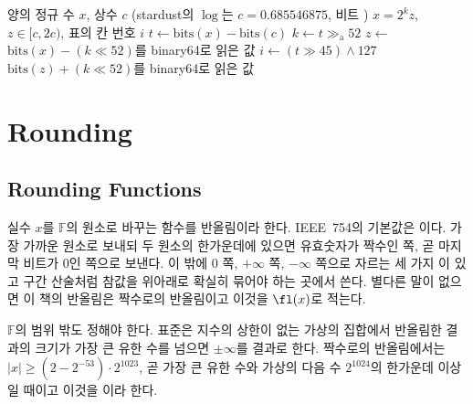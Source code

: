 \begin{algorithm}[htbp]
\begin{algorithmic}[1]
\Require 양의 정규 수 $x$, 상수 $c$ (stardust의 $\log$는 $c=0.685546875$, 비트 )
\Ensure $x=2^kz$, $z\in[c,2c)$, 표의 칸 번호 $i$
\State $t\gets\mathrm{bits}(x)-\mathrm{bits}(c)$ 
\State $k\gets t\gg_{\mathrm{a}}52$ 
\State $z\gets$ $\mathrm{bits}(x)-(k\ll52)$를 binary64로 읽은 값
\State $i\gets(t\gg45)\wedge127$ \Comment{가수의 위 $7$비트로 $[c,2c)$를 $128$칸으로}
 
  \State \Return $\mathrm{bits}(z)+(k\ll52)$를 binary64로 읽은 값
\EndFunction
\end{algorithmic}
\caption{지수 떼어 내기와 $2$의 거듭제곱 곱하기 (stardust 의 , )}
\label{alg:split-exponent}
\end{algorithm}

\section{Rounding}
\label{sec:rounding}

\subsection{Rounding Functions}

실수 $x$를 $\mathbb F$의 원소로 바꾸는 함수를 반올림이라 한다. IEEE~754의 기본값은 이다. 가장 가까운 원소로 보내되 두 원소의 한가운데에 있으면 유효숫자가 짝수인 쪽, 곧 마지막 비트가 $0$인 쪽으로 보낸다. 이 밖에 $0$ 쪽, $+\infty$ 쪽, $-\infty$ 쪽으로 자르는 세 가지 이 있고 구간 산술처럼 참값을 위아래로 확실히 묶어야 하는 곳에서 쓴다. 별다른 말이 없으면 이 책의 반올림은 짝수로의 반올림이고 이것을 $\fl(x)$로 적는다.

$\mathbb F$의 범위 밖도 정해야 한다. 표준은 지수의 상한이 없는 가상의 집합에서 반올림한 결과의 크기가 가장 큰 유한 수를 넘으면 $\pm\infty$를 결과로 한다. 짝수로의 반올림에서는 $|x|\ge(2-2^{-53})\cdot2^{1023}$, 곧 가장 큰 유한 수와 가상의 다음 수 $2^{1024}$의 한가운데 이상일 때이고 이것을 이라 한다.

